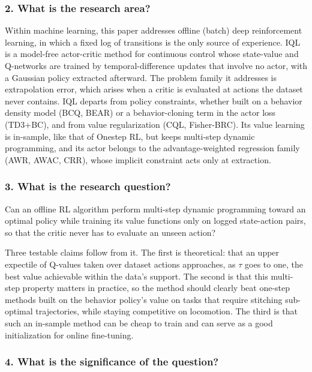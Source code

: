 \documentclass[11pt]{article}
\newcommand{\question}[1]{\subsubsection*{#1}}
\begin{document}
\question{2. What is the research area?}

Within machine learning, this paper addresses offline (batch) deep reinforcement learning, in which a fixed log of transitions is the only source of experience. IQL is a model-free actor-critic method for continuous control whose state-value and Q-networks are trained by temporal-difference updates that involve no actor, with a Gaussian policy extracted afterward. The problem family it addresses is extrapolation error, which arises when a critic is evaluated at actions the dataset never contains. IQL departs from policy constraints, whether built on a behavior density model (BCQ, BEAR) or a behavior-cloning term in the actor loss (TD3+BC), and from value regularization (CQL, Fisher-BRC). Its value learning is in-sample, like that of Onestep RL, but keeps multi-step dynamic programming, and its actor belongs to the advantage-weighted regression family (AWR, AWAC, CRR), whose implicit constraint acts only at extraction.

\question{3. What is the research question?}

Can an offline RL algorithm perform multi-step dynamic programming toward an optimal policy while training its value functions only on logged state-action pairs, so that the critic never has to evaluate an unseen action?

Three testable claims follow from it. The first is theoretical: that an upper expectile of Q-values taken over dataset actions approaches, as \ensuremath{\tau} goes to one, the best value achievable within the data's support. The second is that this multi-step property matters in practice, so the method should clearly beat one-step methods built on the behavior policy's value on tasks that require stitching sub-optimal trajectories, while staying competitive on locomotion. The third is that such an in-sample method can be cheap to train and can serve as a good initialization for online fine-tuning.

\question{4. What is the significance of the question?}
\end{document}

